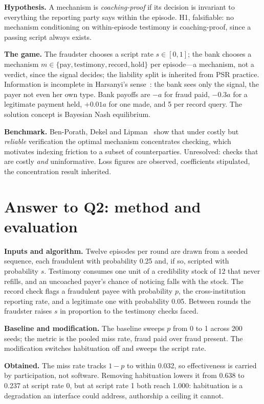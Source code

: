 \textbf{Hypothesis.} A mechanism is \emph{coaching-proof} if its decision
is invariant to everything the reporting party says within the episode.
H1, falsifiable: no mechanism conditioning on within-episode testimony is
coaching-proof, since a passing script always exists.

\textbf{The game.} The fraudster chooses a script rate $s\in[0,1]$; the
bank chooses a mechanism $m\in\{\text{pay},\text{testimony},
\text{record},\text{hold}\}$ per episode---a mechanism, not a verdict,
since the signal decides; the liability split is inherited from PSR
practice. Information is incomplete in Harsanyi's
sense~\cite{harsanyi1968}: the bank sees only the signal, the payer not
even her own type. Bank payoffs are $-a$ for fraud paid,
$-0.3a$ for a legitimate payment held, $+0.01a$ for one made, and 5 per
record query. The solution concept is Bayesian Nash equilibrium.

\textbf{Benchmark.} Ben-Porath, Dekel and Lipman~\cite{benporath2014}
show that under costly but \emph{reliable} verification the optimal
mechanism concentrates checking, which motivates indexing friction to a
subset of counterparties. Unresolved: checks that are costly \emph{and}
uninformative. Loss figures are observed, coefficients stipulated, the
concentration result inherited.

\section{Answer to Q2: method and evaluation}

\textbf{Inputs and algorithm.} Twelve episodes per round are drawn from a
seeded sequence, each fraudulent with probability 0.25 and, if so,
scripted with probability $s$. Testimony consumes one unit of a
credibility stock of 12 that never refills, and an uncoached payer's
chance of noticing falls with the stock. The record check flags a
fraudulent payee with probability $p$, the cross-institution reporting
rate, and a legitimate one with probability 0.05. Between rounds the
fraudster raises $s$ in proportion to the testimony checks faced.

\textbf{Baseline and modification.} The baseline sweeps $p$ from 0 to 1
across 200 seeds; the metric is the pooled miss rate, fraud paid over
fraud present. The modification switches habituation off and sweeps the
script rate.

\textbf{Obtained.} The miss rate tracks $1-p$ to within 0.032, so
effectiveness is carried by participation, not software. Removing
habituation lowers it from 0.638 to 0.237 at script rate 0, but at script
rate 1 both reach 1.000: habituation is a degradation an interface could
address, authorship a ceiling it cannot.

